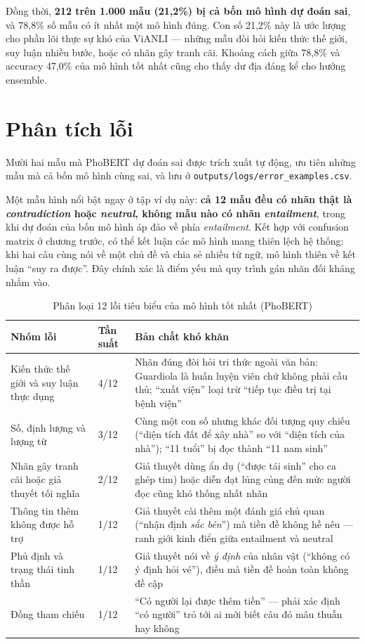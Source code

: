 \documentclass[12pt,a4paper,oneside]{report}
\begin{document}
Đồng thời, \textbf{212 trên 1.000 mẫu (21,2\%) bị cả bốn mô hình dự đoán sai}, và 78,8\%
số mẫu có ít nhất một mô hình đúng. Con số 21,2\% này là ước lượng cho phần lõi thực sự
khó của ViANLI --- những mẫu đòi hỏi kiến thức thế giới, suy luận nhiều bước, hoặc có nhãn
gây tranh cãi. Khoảng cách giữa 78,8\% và accuracy 47,0\% của mô hình tốt nhất cũng cho
thấy dư địa đáng kể cho hướng ensemble.

\section{Phân tích lỗi}

Mười hai mẫu mà PhoBERT dự đoán sai được trích xuất tự động, ưu tiên những mẫu mà cả bốn
mô hình cùng sai, và lưu ở \texttt{outputs/logs/error\_examples.csv}.

Một mẫu hình nổi bật ngay ở tập ví dụ này: \textbf{cả 12 mẫu đều có nhãn thật là
\textit{contradiction} hoặc \textit{neutral}, không mẫu nào có nhãn \textit{entailment}},
trong khi dự đoán của bốn mô hình áp đảo về phía \textit{entailment}. Kết hợp với
confusion matrix ở chương trước, có thể kết luận các mô hình mang thiên lệch hệ thống:
khi hai câu cùng nói về một chủ đề và chia sẻ nhiều từ ngữ, mô hình thiên về kết luận
``suy ra được''. Đây chính xác là điểm yếu mà quy trình gán nhãn đối kháng nhắm vào.

\begin{table}[H]
\centering
\small
\caption{Phân loại 12 lỗi tiêu biểu của mô hình tốt nhất (PhoBERT)}
\begin{tabularx}{\textwidth}{@{}L{4.1cm}C{1.6cm}Y@{}}
\toprule
\textbf{Nhóm lỗi} & \textbf{Tần suất} & \textbf{Bản chất khó khăn} \\
\midrule
Kiến thức thế giới và suy luận thực dụng & 4/12 &
  Nhãn đúng đòi hỏi tri thức ngoài văn bản: Guardiola là huấn luyện viên chứ không
  phải cầu thủ; ``xuất viện'' loại trừ ``tiếp tục điều trị tại bệnh viện'' \\
Số, định lượng và lượng từ & 3/12 &
  Cùng một con số nhưng khác đối tượng quy chiếu (``diện tích đất để xây nhà'' so với
  ``diện tích của nhà''); ``11 tuổi'' bị đọc thành ``11 nam sinh'' \\
Nhãn gây tranh cãi hoặc giả thuyết tối nghĩa & 2/12 &
  Giả thuyết dùng ẩn dụ (``được tái sinh'' cho ca ghép tim) hoặc diễn đạt lủng củng
  đến mức người đọc cũng khó thống nhất nhãn \\
Thông tin thêm không được hỗ trợ & 1/12 &
  Giả thuyết cài thêm một đánh giá chủ quan (``nhận định \textit{sắc bén}'') mà tiền đề
  không hề nêu --- ranh giới kinh điển giữa entailment và neutral \\
Phủ định và trạng thái tinh thần & 1/12 &
  Giả thuyết nói về \textit{ý định} của nhân vật (``không có ý định hỏi vé''), điều mà
  tiền đề hoàn toàn không đề cập \\
Đồng tham chiếu & 1/12 &
  ``Có người lại được thêm tiền'' --- phải xác định ``có người'' trỏ tới ai mới biết
  câu đó mâu thuẫn hay không \\
\bottomrule
\end{tabularx}
\end{table}
\end{document}
